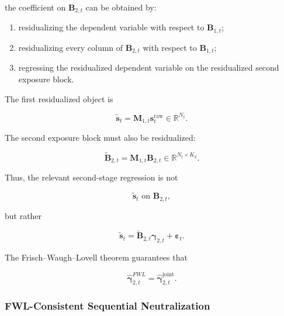 \documentclass[11pt,a4paper]{article}
\begin{document}
the coefficient on $\mathbf{B}_{2,t}$ can be obtained by:

\begin{enumerate}
    \item residualizing the dependent variable with respect to
    $\mathbf{B}_{1,t}$;

    \item residualizing every column of $\mathbf{B}_{2,t}$ with respect to
    $\mathbf{B}_{1,t}$;

    \item regressing the residualized dependent variable on the residualized
    second exposure block.
\end{enumerate}

The first residualized object is

\begin{equation}
\boxed{
\widetilde{\mathbf{s}}_t
=
\mathbf{M}_{1,t}
\mathbf{s}_t^{\mathrm{raw}}
\in
\mathbb{R}^{N_t}.
}
\end{equation}

The second exposure block must also be residualized:

\begin{equation}
\boxed{
\widetilde{\mathbf{B}}_{2,t}
=
\mathbf{M}_{1,t}
\mathbf{B}_{2,t}
\in
\mathbb{R}^{N_t\times K_2}.
}
\end{equation}

Thus, the relevant second-stage regression is not

\begin{equation}
\widetilde{\mathbf{s}}_t
\text{ on }
\mathbf{B}_{2,t},
\end{equation}

but rather

\begin{equation}
\boxed{
\widetilde{\mathbf{s}}_t
=
\widetilde{\mathbf{B}}_{2,t}
\boldsymbol{\gamma}_{2,t}
+
\boldsymbol{\varepsilon}_t.
}
\end{equation}

The Frisch--Waugh--Lovell theorem guarantees that

\begin{equation}
\boxed{
\widehat{\boldsymbol{\gamma}}_{2,t}^{FWL}
=
\widehat{\boldsymbol{\gamma}}_{2,t}^{\mathrm{joint}}.
}
\end{equation}


\subsubsection{FWL-Consistent Sequential Neutralization}
\end{document}
